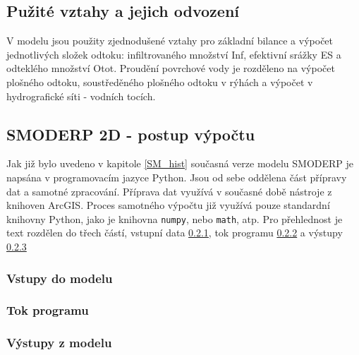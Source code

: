 \subsection{Pužité vztahy a jejich odvození} \label{modelovani}

V modelu jsou použity zjednodušené vztahy pro základní bilance a výpočet jednotlivých složek odtoku: infiltrovaného množství \acs{Inf}, efektivní srážky \acs{ES} a odteklého množství \acs{Otot}. Proudění povrchové vody je rozděleno na výpočet plošného odtoku, soustředěného plošného odtoku v rýhách a výpočet v hydrografické síti - vodních tocích.

	


\subsection{SMODERP 2D - postup výpočtu} \label{vypocet}
Jak již bylo uvedeno v kapitole \ref{SM_hist} současná verze modelu SMODERP je napsána v programovacím jazyce Python. Jsou od sebe oddělena část přípravy dat a samotné zpracování.
Příprava dat využívá v současné době nástroje z knihoven ArcGIS. Proces samotného výpočtu již využívá pouze standardní knihovny Python, jako je knihovna \texttt{numpy}, nebo \texttt{math}, atp. Pro přehlednost je text rozdělen do třech částí, vstupní data \ref{kap:vstupy}, tok programu \ref{kap:tok} a výstupy \ref{kap:vystupy}

%	
		
	
	\subsubsection{Vstupy do modelu} \label{kap:vstupy}
	 
	
	\subsubsection{Tok programu} \label{kap:tok}
	
	
	\subsubsection{Výstupy z modelu} \label{kap:vystupy}
	

